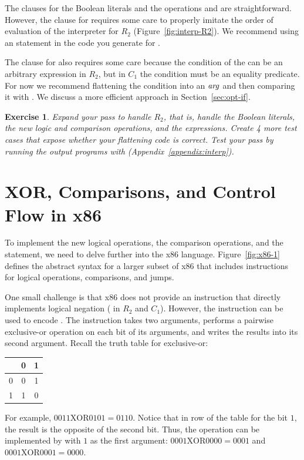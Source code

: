 \documentclass[11pt]{book}
\newtheorem{exercise}[theorem]{Exercise}
\begin{document}
The  clauses for the Boolean literals and the operations
 and  are straightforward.  However, the
 clause for  requires some care to properly
imitate the order of evaluation of the interpreter for $R_2$
(Figure~\ref{fig:interp-R2}). We recommend using an  statement
in the code you generate for .

The  clause for  also requires some care because
the condition of the  can be an arbitrary expression in $R_2$,
but in $C_1$ the condition must be an equality predicate. For now we
recommend flattening the condition into an $\mathit{arg}$ and then comparing
it with . We discuss a more efficient approach in
Section~\ref{sec:opt-if}.


\begin{exercise}\normalfont
Expand your  pass to handle $R_2$, that is, handle the
Boolean literals, the new logic and comparison operations, and the
 expressions. Create 4 more test cases that expose whether
your flattening code is correct. Test your  pass by
running the output programs with 
(Appendix~\ref{appendix:interp}).
\end{exercise}


\section{XOR, Comparisons, and Control Flow in x86}
\label{sec:x86-1}

To implement the new logical operations, the comparison operations,
and the  statement, we need to delve further into the x86
language. Figure~\ref{fig:x86-1} defines the abstract syntax for a
larger subset of x86 that includes instructions for logical
operations, comparisons, and jumps.

One small challenge is that x86 does not provide an instruction that
directly implements logical negation ( in $R_2$ and $C_1$).
However, the  instruction can be used to encode .
The  instruction takes two arguments, performs a pairwise
exclusive-or operation on each bit of its arguments, and writes the
results into its second argument.  Recall the truth table for
exclusive-or:
\begin{center}
\begin{tabular}{l|cc}
   & 0 & 1 \\ \hline
0  & 0 & 1 \\
1  & 1 & 0
\end{tabular}
\end{center}
For example, $0011 \mathrel{\mathrm{XOR}} 0101 = 0110$.  Notice that
in row of the table for the bit $1$, the result is the opposite of the
second bit.  Thus, the  operation can be implemented by
 with $1$ as the first argument: $0001
\mathrel{\mathrm{XOR}} 0000 = 0001$ and $0001 \mathrel{\mathrm{XOR}}
0001 = 0000$.
\end{document}
